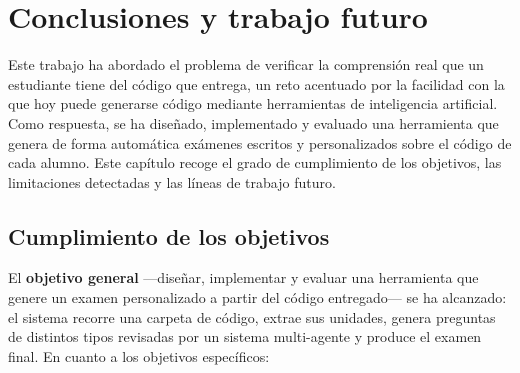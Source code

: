 \chapter{Conclusiones y trabajo futuro}
\label{cap:conclusiones}

Este trabajo ha abordado el problema de verificar la comprensión real que un
estudiante tiene del código que entrega, un reto acentuado por la facilidad con
la que hoy puede generarse código mediante herramientas de inteligencia
artificial. Como respuesta, se ha diseñado, implementado y evaluado una
herramienta que genera de forma automática exámenes escritos y personalizados
sobre el código de cada alumno. Este capítulo recoge el grado de cumplimiento
de los objetivos, las limitaciones detectadas y las líneas de trabajo futuro.


\section{Cumplimiento de los objetivos}
\label{sec:cumplimiento-objetivos}

El \textbf{objetivo general} ---diseñar, implementar y evaluar una herramienta
que genere un examen personalizado a partir del código entregado--- se ha
alcanzado: el sistema recorre una carpeta de código, extrae sus unidades,
genera preguntas de distintos tipos revisadas por un sistema multi-agente y
produce el examen final. En cuanto a los objetivos específicos:

